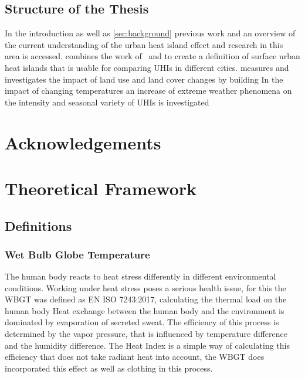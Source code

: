 \documentclass[a4paper, english]{article}
\begin{document}

    \subsection{Structure of the Thesis}
    In the introduction as well as \cref{sec:background} previous work and an overview of the current understanding of the urban heat island effect and research in this area is accessed. 
     combines the work of~\cite{Sobrino2020} and %
    to create a definition of surface urban heat islands that is usable for comparing \glspl{UHI} in different cities.  
     measures and investigates the impact of land use and land cover changes by building
    In  the impact of changing temperatures an increase of extreme weather phenomena on the intensity and seasonal variety of \glspl{UHI} is investigated 

   

\section*{Acknowledgements}

\section{Theoretical Framework}
    \subsection{Definitions}
    
    \subsubsection{Wet Bulb Globe Temperature}
    The human body reacts to heat stress differently in different environmental conditions. 
    Working under heat stress poses a serious health issue, for this the \gls{WBGT} was defined as EN ISO 7243:2017, calculating the thermal load on the human body\cite{14001700}
    Heat exchange between the human body and the environment is dominated by evaporation of secreted sweat.
    The efficiency of this process is determined by the vapor pressure, that is influenced by temperature difference and the humidity difference. %
    The Heat Index is a simple way of calculating this efficiency that does not take radiant heat into account, the WBGT does incorporated this effect as well as clothing in this process. 
\end{document}
